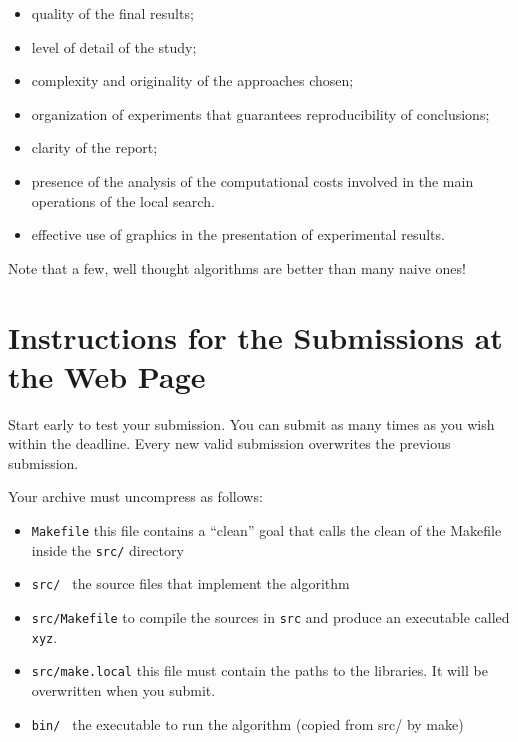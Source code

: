 \begin{remarks}
\begin{itemize} 
\item quality of the final results;
\item level of detail of the study;
\item complexity and originality of the approaches chosen;
\item organization of experiments that guarantees reproducibility of
  conclusions;
\item clarity of the report;
\item presence of the analysis of the computational costs involved in
  the main operations of the local search.

\item effective use of graphics in the presentation of experimental results.
\end{itemize}


\item 
Note that a few, well thought algorithms are better than many naive ones!

\end{remarks}

\newpage



\section{Instructions for the Submissions at the Web Page}
\label{a1}


Start early to test your submission. You can submit as many times as you
wish within the deadline. Every new valid submission overwrites the
previous submission.

Your archive must uncompress as follows:

\begin{itemize}
\item \texttt{Makefile} this file contains a ``clean'' goal that calls
  the clean of the Makefile inside the \texttt{src/} directory
\item \texttt{src/ } the source files that implement the algorithm
\item \texttt{src/Makefile} to compile the sources in \verb=src= and
 produce an executable called \verb=xyz=.
\item \texttt{src/make.local} this file must contain the paths to the
  libraries. It will be overwritten when you submit.
\item \texttt{bin/ } the executable to run the algorithm (copied from
  src/ by make)
\end{itemize}


